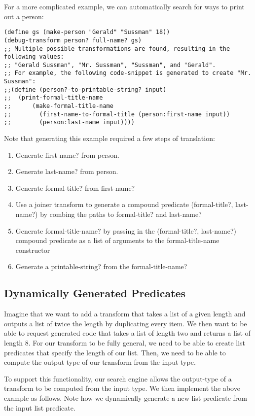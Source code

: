 \documentclass[letterpaper]{article}
\begin{document}
For a more complicated example, we can automatically search for ways to print out a person:

\begin{verbatim}
(define gs (make-person "Gerald" "Sussman" 18))
(debug-transform person? full-name? gs)
;; Multiple possible transformations are found, resulting in the following values:
;; "Gerald Sussman", "Mr. Sussman", "Sussman", and "Gerald".
;; For example, the following code-snippet is generated to create "Mr. Sussman": 
;;(define (person?-to-printable-string? input)
;;  (print-formal-title-name 
;;      (make-formal-title-name 
;;        (first-name-to-formal-title (person:first-name input)) 
;;        (person:last-name input))))

\end{verbatim}

Note that generating this example required a few steps of translation:
\begin{enumerate}
  \item Generate first-name? from person.
  \item Generate last-name? from person.
  \item Generate formal-title? from first-name?
  \item Use a joiner transform to generate a compound predicate (formal-title?, last-name?) by combing the paths to formal-title? and last-name?
  \item Generate formal-title-name? by passing in the (formal-title?, last-name?) compound predicate as a list of arguments to the formal-title-name constructor
  \item Generate a printable-string? from the formal-title-name?
\end{enumerate}

\subsection{Dynamically Generated Predicates}

Imagine that we want to add a transform that takes a list of a given length and outputs a list of twice the length by duplicating every item. We then want to be able to request generated code that takes a list of length two and returns a list of length 8. For our transform to be fully general, we need to be able to create list predicates that specify the length of our list. Then, we need to be able to compute the output type of our transform from the input type. 

To support this functionality, our search engine allows the output-type of a transform to be computed from the input type. We then implement the above example as follows. Note how we dynamically generate a new list predicate from the input list predicate.
\end{document}
